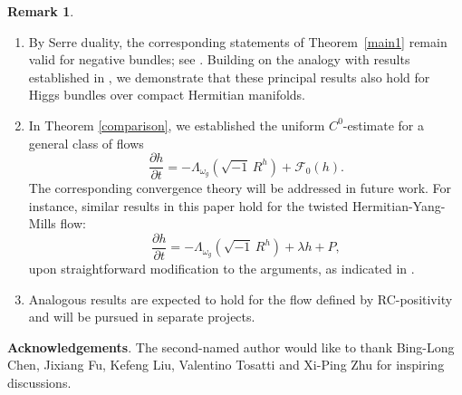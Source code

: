 \documentclass[12pt, reqno]{amsart}
\theoremstyle{plain}
\theoremstyle{definition}
\newtheorem{remark}[thm]{Remark}
\newcommand{\bremark}{\begin{remark}}
\newcommand{\eremark}{\end{remark}}
\newcommand{\beq}{\begin{equation}}
\newcommand{\eeq}{\end{equation}}
\newcommand{\bd}{\begin{enumerate}}
\newcommand{\ed}{\end{enumerate}}
\renewcommand{\>}{\rightarrow}
\renewcommand{\>}{\rightarrow}
\numberwithin{equation}{section} %
\begin{document}
\bremark
\bd
\item By Serre duality, the corresponding statements of Theorem~\ref{main1} remain valid for negative bundles; see \cite{WYY26+}.  Building on the analogy with results established in \cite{FWYY26+}, we demonstrate that these principal results also hold for Higgs bundles over compact Hermitian manifolds.

\item  In Theorem \ref{comparison}, we established the uniform $C^0$-estimate for a  general class of flows \beq \frac{\partial h}{\partial t} = -\Lambda_{\omega_g}\left(\sqrt{-1}\, R^h\right) + \mathcal{F}_0(h). \eeq
The corresponding convergence theory will be addressed in future work.  For instance, similar results in this paper hold for the twisted Hermitian-Yang-Mills flow:
\beq \frac{\partial h}{\partial t} = -\Lambda_{\omega_g}\left(\sqrt{-1}\, R^h\right) +\lambda h+P, \eeq
upon straightforward modification to the arguments, as indicated in \cite{WYY26b+}.
\item Analogous results are expected to hold for the flow defined by RC-positivity and will be pursued in separate projects.
\ed
\eremark
    \noindent\textbf{Acknowledgements}. The second-named author would like to thank   Bing-Long Chen,  Jixiang Fu,  Kefeng Liu, Valentino Tosatti and Xi-Ping Zhu for inspiring  discussions.

\baselineskip
\end{document}
